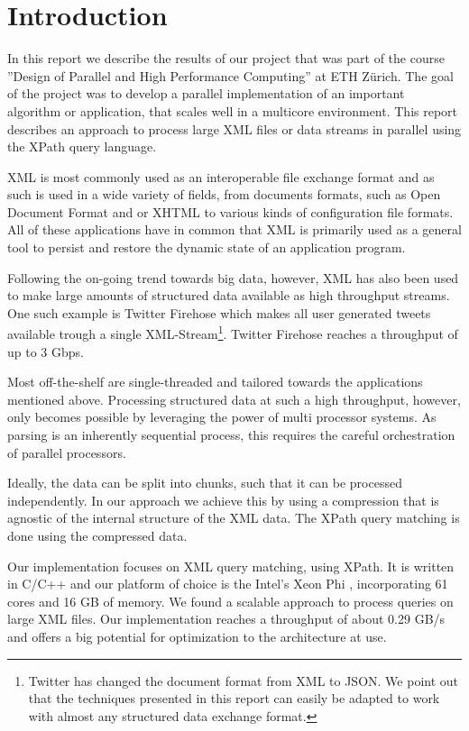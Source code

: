 \section{Introduction}\label{sec:intro}

In this report we describe the results of our project that was part of the
course ''Design of Parallel and High Performance Computing'' at ETH Z\"urich.
The goal of the project was to develop a parallel implementation of an important
algorithm or application, that scales well in a multicore environment. This
report describes an approach to process large XML files or data streams in
parallel using the XPath query language.

XML is most commonly used as an interoperable file exchange format and as such
is used in a wide variety of fields, from documents formats, such as Open
Document Format  and or XHTML  to various kinds of
configuration file formats. All of these applications have in common that XML is
primarily used as a general tool to persist and restore the dynamic state of an
application program.

Following the on-going trend towards big data, however, XML has also been used
to make large amounts of structured data available as high throughput streams.
One such example is Twitter Firehose which makes all user generated tweets
available trough a single XML-Stream\footnote{Twitter has changed the document
format from XML to JSON. We point out that the techniques presented in this
report can easily be adapted to work with almost any structured data exchange
format.}. Twitter Firehose reaches a throughput of up to 3 Gbps.

Most off-the-shelf are single-threaded and tailored towards the applications
mentioned above. Processing structured data at such a high throughput, however,
only becomes possible by leveraging the power of multi processor systems. As
parsing is an inherently sequential process, this requires the careful
orchestration of parallel processors.

Ideally, the data can be split into chunks, such that it can be processed independently.
In our approach we achieve this by using a compression that is agnostic of the
internal structure of the XML data. The XPath query matching is done using the
compressed data.

Our implementation focuses on XML query matching, using XPath. It is written in
C/C++ and our platform of choice is the Intel's Xeon Phi \cite{IntelXeon}, incorporating 61 cores
and 16 GB of memory. We found a scalable approach to process queries on large
XML files. Our implementation reaches a throughput of about 0.29 GB/s and offers
a big potential for optimization to the architecture at use. 

